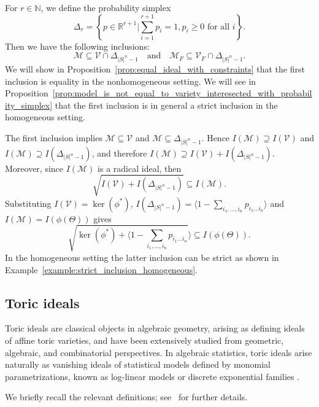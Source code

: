 \documentclass[11pt, a4paper]{article}
\numberwithin{equation}{section}
\theoremstyle{plain}
\theoremstyle{definition}
\begin{document}
For $r \in \mathbb{N}$, we define the probability simplex
\[
\Delta_r=\left\{ p \in \mathbb{R}^{r+1} | \sum_{i=1}^{r+1} p_i = 1, p_i \geq 0 \text{ for all } i \right\}.
\]
Then we have the following inclusions:
\[
\mathcal{M} \subseteq \mathcal{V} \cap \Delta_{|S|^n-1} \quad \text{and} \quad \mathcal{M}_F \subseteq \mathcal{V}_F \cap \Delta_{|S|^n-1}.
\]
We will show in Proposition~\ref{prop:equal_ideal_with_constraints} that the first inclusion is equality in the nonhomogeneous setting. We will see in Proposition~\ref{prop:model_is_not_equal_to_variety_interesected_with_probability_simplex}  that the first inclusion is in general a strict inclusion in the homogeneous setting.

The first inclusion implies $\mathcal{M} \subseteq \mathcal{V}$ and $\mathcal{M} \subseteq \Delta_{|S|^n-1}$. Hence $I(\mathcal{M}) \supseteq I(\mathcal{V})$ and $I(\mathcal{M}) \supseteq I(\Delta_{|S|^n-1})$, and therefore $I(\mathcal{M}) \supseteq I(\mathcal{V}) + I(\Delta_{|S|^n-1})$. Moreover, since $I(\mathcal{M})$ is a radical ideal, then 
\[
 \sqrt{I(\mathcal{V}) + I(\Delta_{|S|^n-1})} \subseteq I(\mathcal{M}) .
\]
Substituting $I(\mathcal{V})= \ker (\phi^*)$, $I(\Delta_{|S|^n-1}) = \langle 1-\sum_{i_1,\ldots, i_n}p_{i_1\ldots i_n}\rangle$ and $I(\mathcal{M}) = I(\phi(\Theta))$ gives
\begin{equation} \label{eqn:inclusion_of_inequalities}
\sqrt{\ker (\phi^*)+\langle 1-\sum_{i_1,\ldots, i_n}p_{i_1\ldots i_n}}\rangle\subseteq I(\phi(\Theta)).
\end{equation}
 In the homogeneous setting the latter inclusion can be strict as shown in Example~\ref{example:strict_inclusion_homogeneous}.


\subsection{Toric ideals} \label{sec:toric_ideals}

Toric ideals are classical objects in algebraic geometry, arising as defining ideals of affine toric
varieties, and have been extensively studied from geometric, algebraic, and combinatorial
perspectives. In algebraic statistics, toric ideals arise naturally as vanishing ideals of statistical
models defined by monomial parametrizations, known as log-linear models or discrete exponential
families
\cite{diaconis1998algebraic,dobra2003markov,sullivant2023algebraic,kateri2015family}.

We briefly recall the relevant definitions; see~\cite{sullivant2023algebraic} for further details.
\end{document}
